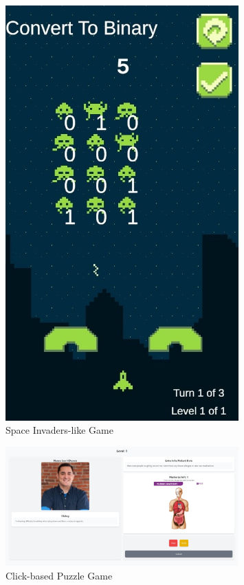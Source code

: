 \begin{figure}
	\centering
	\includegraphics[width=0.8\textwidth]{figures/Space_Invaders/Space_Invaders_Game.jpeg}
	\caption{Space Invaders-like Game}
	\label{fig:gameplaySpaceInvaders}
\end{figure}

\begin{figure}
	\centering
	\includegraphics[width=0.8\textwidth]{figures/Diagnose_Game/Diagnose_Game.jpeg}
	\caption{Click-based Puzzle Game}
	\label{fig:gameplayClickPuzzle}
\end{figure}

